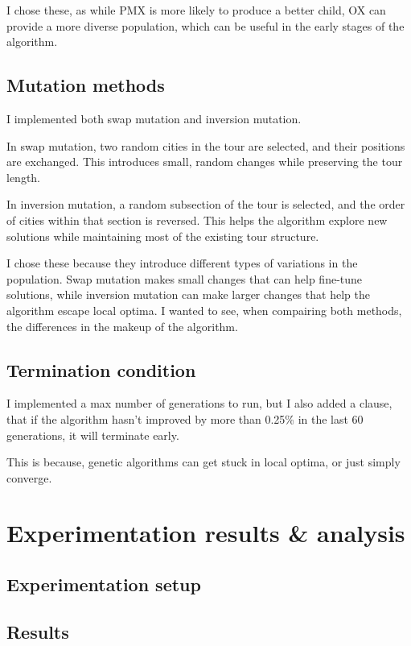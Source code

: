 \documentclass[11pt]{scrartcl} %
\begin{document}
I chose these, as while PMX is more likely to produce a better child, OX can provide a more diverse population, which can be useful in the early stages of the algorithm.

\subsection{Mutation methods}

I implemented both swap mutation and inversion mutation.

In swap mutation, two random cities in the tour are selected, and their positions are exchanged. This introduces small, random changes while preserving the tour length.

In inversion mutation, a random subsection of the tour is selected, and the order of cities within that section is reversed. This helps the algorithm explore new solutions while maintaining most of the existing tour structure.

I chose these because they introduce different types of variations in the population. Swap mutation makes small changes that can help fine-tune solutions, while inversion mutation can make larger changes that help the algorithm escape local optima. 
I wanted to see, when compairing both methods, the differences in the makeup of the algorithm.

\subsection{Termination condition}
I implemented a max number of generations to run, but I also added a clause, that if the algorithm hasn't improved by more than 0.25\% in the last 60 generations, it will terminate early.

This is because, genetic algorithms can get stuck in local optima, or just simply converge.






\section{Experimentation results \& analysis}
\subsection{Experimentation setup}

\subsection{Results}
\end{document}
